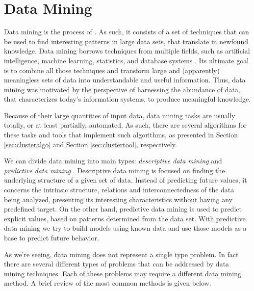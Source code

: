 \section{Data Mining}\label{sec:mlearning}


Data mining is the process of  \cite[p. 5]{han2006data}. As such, it consists of a
set of techniques that can be used to find interesting patterns in large data
sets, that translate in newfound knowledge. Data mining borrows techniques from
multiple fields, such as artificial intelligence, machine learning, statistics,
and database systems \cite{Chakrabarti2012}. Its ultimate goal is to combine all
those techniques and transform large and (apparently) meaningless sets of data
into understandable and useful information. Thus, data mining was motivated by
the perspective of harnessing the abundance of data, that characterizes today's
information systems, to produce meaningful knowledge.

Because of their large quantities of input data, data mining tasks are usually
totally, or at least partially, automated. As such, there are several algorithms
for these tasks and tools that implement such algorithms, as presented in
Section \ref{sec:clusteralgo} and Section \ref{sec:clustertool}, respectively.

We can divide data mining into main types: \emph{descriptive data mining} and
\emph{predictive data mining} \cite{Fayyad1996}. Descriptive data mining is
focused on finding the underlying structure of a given set of data. Instead of
predicting future values, it concerns the intrinsic structure, relations and
interconnectedness of the data being analyzed, presenting its interesting
characteristics without having any predefined target. On the other hand,
predictive data mining is used to predict explicit values, based on patterns
determined from the data set. With predictive data mining we try to build models
using known data and use those models as a base to predict future behavior.

As we're seeing, data mining does not represent a single type problem. In fact
there are several different types of problems that can be addressed by data
mining techniques. Each of these problems may require a different data mining
method. A brief review of the most common methods is given below.

